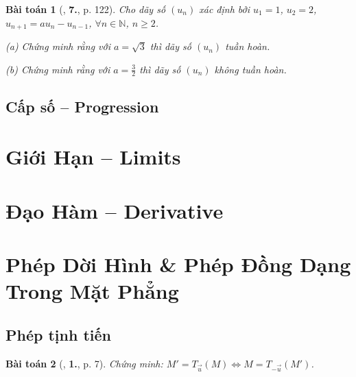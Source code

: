 \documentclass{article}
\numberwithin{equation}{section}
\newtheorem{baitoan}{Bài toán}[section]
\begin{document}
\begin{baitoan}[\cite{TL_chuyen_Toan_Dai_So_Giai_Tich_11}, \textbf{7.}, p. 122]
	Cho dãy số $(u_n)$ xác định bởi $u_1 = 1$, $u_2 = 2$, $u_{n+1} = au_n - u_{n-1}$, $\forall n\in\mathbb{N}$, $n\ge 2$.
	\begin{enumerate*}
		\item[(a)] Chứng minh rằng với $a = \sqrt{3}$ thì dãy số $(u_n)$ tuần hoàn.
		\item[(b)] Chứng minh rằng với $a = \frac{3}{2}$ thì dãy số $(u_n)$ không tuần hoàn.
	\end{enumerate*}
\end{baitoan}


\subsection{Cấp số -- Progression}




\section{Giới Hạn -- Limits}


\section{Đạo Hàm -- Derivative}


\section{Phép Dời Hình \& Phép Đồng Dạng Trong Mặt Phẳng}

\subsection{Phép tịnh tiến}

\begin{baitoan}[\cite{SGK_Toan_11_dai_so_giai_tich_co_ban}, \textbf{1.}, p. 7]
	\label{prob:phep tinh tien}
	Chứng minh: $M' = T_{\vec{u}}(M)\Leftrightarrow M = T_{-\vec{u}}(M')$.
\end{baitoan}
\end{document}
